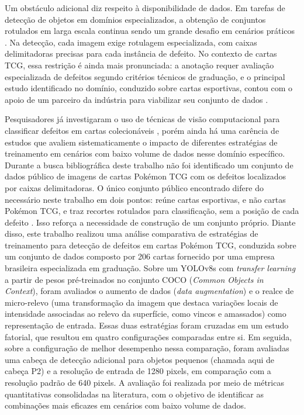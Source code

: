 \documentclass[
    12pt,                %
    openright,           %
    oneside,             %
    a4paper,             %
    english,             %
    brazil               %
]{abntex2}
\begin{document}
Um obstáculo adicional diz respeito à disponibilidade de dados. Em 
tarefas de detecção de objetos em domínios especializados, a obtenção
de conjuntos rotulados em larga escala continua sendo um grande desafio
em cenários práticos \cite{Situ2023}. Na detecção, cada imagem exige
rotulagem especializada, com caixas delimitadoras precisas para cada
instância de defeito. No contexto de cartas TCG,
essa restrição é ainda mais pronunciada: a anotação requer avaliação especializada 
de defeitos segundo critérios técnicos de graduação, e o principal estudo identificado no domínio, conduzido sobre cartas esportivas, contou
com o apoio de um parceiro da indústria para viabilizar seu conjunto de dados
\cite{Nahar2025}.

Pesquisadores já investigaram o uso de técnicas de visão computacional
para classificar defeitos em cartas colecionáveis \cite{Nahar2025}, porém ainda há uma carência de estudos que avaliem
sistematicamente o impacto de diferentes estratégias de treinamento em
cenários com baixo volume de dados nesse domínio específico. Durante a
busca bibliográfica deste trabalho não foi identificado um conjunto de
dados público de imagens de cartas Pokémon TCG com os defeitos
localizados por caixas delimitadoras. O único conjunto público
encontrado difere do necessário neste trabalho em dois pontos: reúne
cartas esportivas, e não cartas Pokémon TCG, e traz recortes rotulados
para classificação, sem a posição de cada defeito \cite{Nahar2025b}.
Isso reforça a necessidade de construção de um conjunto próprio. Diante
disso, este trabalho realizou uma análise comparativa de estratégias de
treinamento para detecção de defeitos em cartas Pokémon TCG, conduzida
sobre um conjunto de dados composto por 206 cartas fornecido por uma
empresa brasileira especializada em graduação. Sobre um YOLOv8s com
\textit{transfer learning} a partir de pesos pré-treinados no conjunto
COCO (\textit{Common Objects in Context}), foram avaliados o aumento de dados (\textit{data augmentation}) e
o realce de micro-relevo (uma transformação da imagem que destaca
variações locais de intensidade associadas ao relevo da superfície,
como vincos e amassados) como representação de entrada. Essas duas estratégias foram cruzadas em um estudo fatorial,
que resultou em quatro configurações comparadas entre si. Em seguida,
sobre a configuração de melhor desempenho nessa comparação, foram
avaliadas uma cabeça de detecção adicional para objetos pequenos (chamada aqui de cabeça P2) e
a resolução de entrada de 1280 pixels, em comparação com a resolução
padrão de 640 pixels. A avaliação foi realizada por meio de métricas
quantitativas consolidadas na literatura, com o objetivo de identificar
as combinações mais eficazes em cenários com baixo volume de dados.
\end{document}
